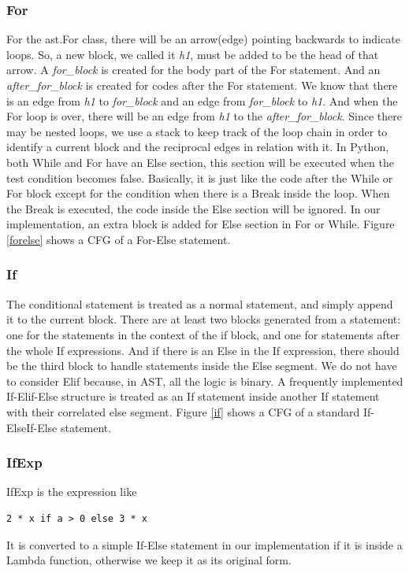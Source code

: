 \documentclass[11pt]{article}
\begin{document}
\subsubsection{For}
For the ast.For class, there will be an arrow(edge) pointing backwards to indicate loops. So, a new block, we called it \textit{h1}, must be added to be the head of that arrow. A \textit{for\_block} is created for the body part of the For statement. And an \textit{after\_for\_block} is created for codes after the For statement. We know that there is an edge from \textit{h1} to \textit{for\_block} and an edge from \textit{for\_block} to \textit{h1}. And when the For loop is over, there will be an edge from \textit{h1} to the \textit{after\_for\_block}. Since there may be nested loops, we use a stack to keep track of the loop chain in order to identify a current block and the reciprocal edges in relation with it. In Python, both While and For have an Else section, this section will be executed when the test condition becomes false. Basically, it is just like the code after the While or For block except for the condition when there is a Break inside the loop. When the Break is executed, the code inside the Else section will be ignored. In our implementation, an extra block is added for Else section in For or While. Figure \ref{forelse} shows a CFG of a For-Else statement. 

\subsubsection{If}
The conditional statement is treated as a normal statement, and simply append it to the current block. There are at least two blocks generated from a statement: one for the statements in the context of the if block, and one for statements after the whole If expressions. And if there is an Else in the If expression, there should be the third block to handle statements inside the Else segment. We do not have to consider Elif because, in AST, all the logic is binary. A frequently implemented If-Elif-Else structure is treated as an If statement inside another If statement with their correlated else segment. Figure \ref{if} shows a CFG of a standard If-ElseIf-Else statement.

\subsubsection{IfExp}
IfExp is the expression like
\begin{lstlisting}
2 * x if a > 0 else 3 * x
\end{lstlisting}
It is converted to a simple If-Else statement in our implementation if it is inside a Lambda function, otherwise we keep it as its original form.
\end{document}
